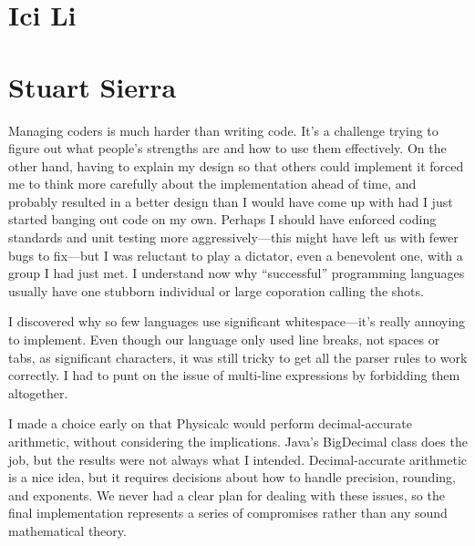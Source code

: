 \section{Ici Li}



\section{Stuart Sierra}

Managing coders is much harder than writing code.  It's a challenge
trying to figure out what people's strengths are and how to use them
effectively.  On the other hand, having to explain my design so that
others could implement it forced me to think more carefully about the
implementation ahead of time, and probably resulted in a better design
than I would have come up with had I just started banging out code on
my own.  Perhaps I should have enforced coding standards and unit
testing more aggressively---this might have left us with fewer bugs to
fix---but I was reluctant to play a dictator, even a benevolent one,
with a group I had just met.  I understand now why ``successful''
programming languages usually have one stubborn individual or large
coporation calling the shots.

I discovered why so few languages use significant whitespace---it's
really annoying to implement.  Even though our language only used line
breaks, not spaces or tabs, as significant characters, it was still
tricky to get all the parser rules to work correctly.  I had to punt
on the issue of multi-line expressions by forbidding them altogether.

I made a choice early on that Physicalc would perform decimal-accurate
arithmetic, without considering the implications.  Java's BigDecimal
class does the job, but the results were not always what I intended.
Decimal-accurate arithmetic is a nice idea, but it requires decisions
about how to handle precision, rounding, and exponents.  We never had
a clear plan for dealing with these issues, so the final
implementation represents a series of compromises rather than any
sound mathematical theory.

